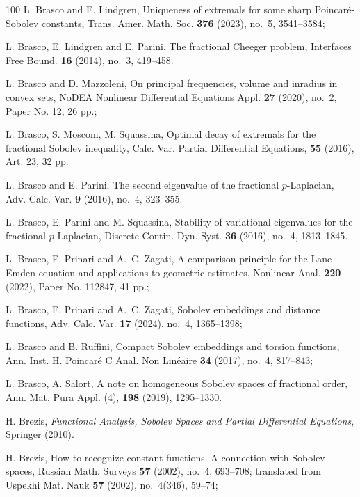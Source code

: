 \documentclass{amsart}
\theoremstyle{definition}
\numberwithin{equation}{section}
\begin{document}
\begin{thebibliography}{100}
	 L. Brasco and E. Lindgren, Uniqueness of extremals for some sharp Poincar\'e-Sobolev constants, Trans. Amer. Math. Soc. {\bf 376} (2023), no.~5, 3541--3584;
	
	 L. Brasco, E. Lindgren and E. Parini, The fractional Cheeger problem, Interfaces Free Bound. {\bf 16} (2014), no.~3, 419--458.
	
	 L. Brasco and D. Mazzoleni, On principal frequencies, volume and inradius in convex sets, NoDEA Nonlinear Differential Equations Appl. {\bf 27} (2020), no.~2, Paper No. 12, 26 pp.; 
	
	 L. Brasco, S. Mosconi, M. Squassina, Optimal decay of extremals for the fractional Sobolev inequality, Calc. Var. Partial Differential Equations, {\bf 55} (2016), Art. 23, 32 pp.
	
	 L. Brasco and E. Parini, The second eigenvalue of the fractional $p$-Laplacian, Adv. Calc. Var. {\bf 9} (2016), no.~4, 323--355.
	
	 L. Brasco, E. Parini and M. Squassina, Stability of variational eigenvalues for the fractional $p$-Laplacian, Discrete Contin. Dyn. Syst. {\bf 36} (2016), no.~4, 1813--1845.
	
	
	
	 L. Brasco, F. Prinari and A.~C. Zagati, A comparison principle for the Lane-Emden equation and applications to geometric estimates, Nonlinear Anal. {\bf 220} (2022), Paper No. 112847, 41 pp.; 
	
	 L. Brasco, F. Prinari and A.~C. Zagati, Sobolev embeddings and distance functions, Adv. Calc. Var. {\bf 17} (2024), no.~4, 1365--1398;
	
	
	 L. Brasco and B. Ruffini, Compact Sobolev embeddings and torsion functions, Ann. Inst. H. Poincar\'e{} C Anal. Non Lin\'eaire {\bf 34} (2017), no.~4, 817--843; 
	
	 L. Brasco, A. Salort, A note on homogeneous Sobolev spaces of fractional order, Ann. Mat. Pura Appl. (4),  {\bf 198} (2019), 1295--1330.
	
	 H. Brezis, {\it Functional Analysis, Sobolev Spaces and Partial Differential Equations}, Springer (2010).
	
	 H. Brezis, How to recognize constant functions. A connection with Sobolev spaces, Russian Math. Surveys {\bf 57} (2002), no.~4, 693--708; translated from Uspekhi Mat. Nauk {\bf 57} (2002), no.~4(346), 59--74;
	

\end{thebibliography}
\end{document}
